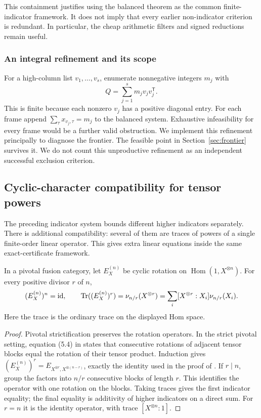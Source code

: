 This containment justifies using the balanced theorem as the common
finite-indicator framework. It does not imply that every earlier
non-indicator criterion is redundant. In particular, the cheap
arithmetic filters and signed reductions remain useful.

\subsubsection{An integral refinement and its scope}
For a high-column list $v_1,\ldots,v_s$, enumerate nonnegative integers
$m_j$ with
\begin{equation}\label{eq:integergram}
 Q=\sum_{j=1}^s m_jv_jv_j^{\mathsf T}.
\end{equation}
This is finite because each nonzero $v_j$ has a positive diagonal entry.
For each frame append
$\sum_\tau x_{v_j,\tau}=m_j$ to the balanced system. Exhaustive
infeasibility for every frame would be a further valid obstruction.
We implement this refinement principally to diagnose the frontier.
The feasible point in Section~\ref{sec:frontier} survives it. We do
not count this unproductive refinement as an independent successful
exclusion criterion.

\subsection{Cyclic-character compatibility for tensor powers}\label{sec:rotation}
The preceding indicator system bounds different higher indicators
separately. There is additional compatibility: several of them are
traces of powers of a single finite-order linear operator. This gives
extra linear equations inside the same exact-certificate framework.

\begin{lemma}\label{lem:blockrotation}
In a pivotal fusion category, let $E_X^{(n)}$ be cyclic rotation on
$\operatorname{Hom}(1,X^{\otimes n})$. For every positive divisor $r$ of $n$,
\begin{equation}\label{eq:blockrotation}
 (E_X^{(n)})^n=\mathrm{id},\qquad
 \operatorname{Tr}((E_X^{(n)})^r)=\nu_{n/r}(X^{\otimes r})
   =\sum_i[X^{\otimes r}:X_i]\nu_{n/r}(X_i).
\end{equation}
Here the trace is the ordinary trace on the displayed Hom space.
\end{lemma}
\begin{proof}
Pivotal strictification preserves the rotation operators. In the strict
pivotal setting, equation (5.4) in \cite{NSpiv} states that consecutive
rotations of adjacent tensor blocks equal the rotation of their tensor
product. Induction gives
$(E_X^{(n)})^r=E_{X^{\otimes r},X^{\otimes(n-r)}}$, exactly the identity
used in the proof of \cite[Theorem~5.1]{NSpiv}. If $r\mid n$, group the
factors into $n/r$ consecutive blocks of length $r$. This identifies the
operator with one rotation on the blocks. Taking traces gives the first
indicator equality; the final equality is additivity of higher
indicators on a direct sum. For $r=n$ it is the identity operator, with
trace $[X^{\otimes n}:1]$.
\end{proof}

